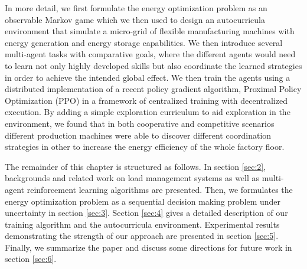 In more detail, we first formulate the energy optimization problem as an observable Markov game which we then used to design an autocurricula environment that simulate  a micro-grid of flexible manufacturing machines with energy generation and energy storage capabilities. We then introduce several multi-agent tasks with comparative goals, where the different agents would need to learn not only highly developed skills but also coordinate the learned strategies in order to achieve the intended global effect. We then train the agents using a distributed implementation of a recent policy gradient algorithm, Proximal Policy Optimization (PPO) \cite{schulman2017proximal} in a framework of centralized training with decentralized execution. By adding a simple exploration curriculum to aid exploration in the environment, we found that in both cooperative and competitive scenarios different production machines were able to discover different coordination strategies in other to increase the energy efficiency of the whole factory floor.

The remainder of this chapter is structured as follows. In section \ref{sec:2}, backgrounds and related work on load management systems as well as multi-agent reinforcement learning algorithms are presented. Then, we formulates the energy optimization problem as a sequential decision making problem under uncertainty in section \ref{sec:3}. Section \ref{sec:4} gives a detailed description of our training algorithm and the autocurricula environment. Experimental results demonstrating the strength of our approach are presented in section \ref{sec:5}. Finally, we summarize the paper and discuss some directions for future work in section \ref{sec:6}.
